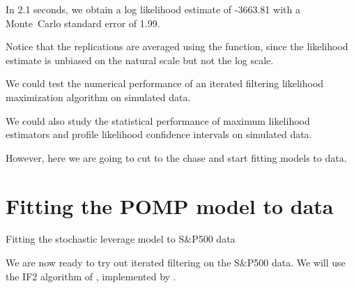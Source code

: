 \begin{frame}[fragile]

\bi

\item In  2.1 seconds, we obtain a log likelihood estimate of -3663.81 with a Monte~Carlo standard error of 1.99.

\item Notice that the replications are averaged using the  function, since the likelihood estimate is unbiased on the natural scale but not the log scale.

\item We could test the numerical performance of an iterated filtering likelihood maximization algorithm on simulated data. 

\item We could also study the statistical performance of maximum likelihood estimators and profile likelihood confidence intervals on simulated data. 

\item However, here we are going to cut to the chase and start fitting models to data. 

\ei

\end{frame}

\section{Fitting the POMP model to data}


\begin{frame}[fragile]{Fitting the stochastic leverage model to S\&P500 data}

\bi

\item We are now ready to try out iterated filtering on the S\&P500 data. We will use the IF2 algorithm of \citet{ionides15}, implemented by .

\ei

\begin{knitrout}\small
{}\color{fgcolor}\begin{kframe}
\begin{alltt}
 \hlkwb{<-} 
 \hlkwb{<-} 
 \hlkwb{<-} 
 \hlkwb{<-} \hldef{(}
    
        
         
   
         \hldef{=} 
         \hldef{=} 
\hldef{)}
\end{alltt}
\end{kframe}
\end{knitrout}

\end{frame}


